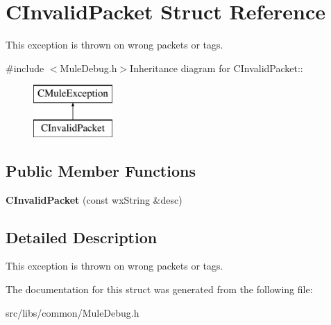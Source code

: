 \section{CInvalidPacket Struct Reference}
\label{structCInvalidPacket}


This exception is thrown on wrong packets or tags.  


{\ttfamily \#include $<$MuleDebug.h$>$}Inheritance diagram for CInvalidPacket::\begin{figure}[H]
\begin{center}
\leavevmode
\includegraphics[height=2cm]{structCInvalidPacket}
\end{center}
\end{figure}
\subsection*{Public Member Functions}
\begin{DoxyCompactItemize}
\item 
{\bfseries CInvalidPacket} (const wxString \&desc)\label{structCInvalidPacket_aa317b5554a957711da6d2890ea6f4282}

\end{DoxyCompactItemize}


\subsection{Detailed Description}
This exception is thrown on wrong packets or tags. 

The documentation for this struct was generated from the following file:\begin{DoxyCompactItemize}
\item 
src/libs/common/MuleDebug.h\end{DoxyCompactItemize}
